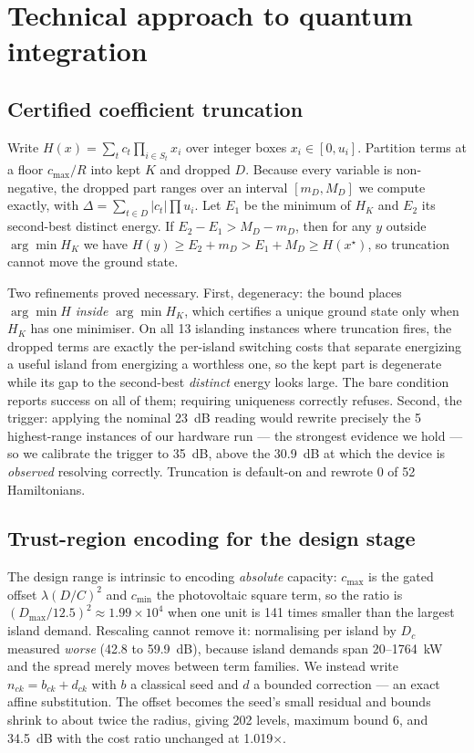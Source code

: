 \documentclass[11pt,twocolumn]{article}
\begin{document}
\section{Technical approach to quantum integration}
\subsection{Certified coefficient truncation}
Write $H(x)=\sum_t c_t \prod_{i \in S_t} x_i$ over integer boxes $x_i \in [0,u_i]$. Partition terms at a floor $c_{\max}/R$ into kept $K$ and dropped $D$. Because every variable is non-negative, the dropped part ranges over an interval $[m_D, M_D]$ we compute exactly, with $\Delta=\sum_{t \in D}|c_t|\prod u_i$. Let $E_1$ be the minimum of $H_K$ and $E_2$ its second-best distinct energy. If $E_2-E_1 > M_D-m_D$, then for any $y$ outside $\arg\min H_K$ we have $H(y) \ge E_2+m_D > E_1+M_D \ge H(x^\star)$, so truncation cannot move the ground state.

Two refinements proved necessary. First, degeneracy: the bound places $\arg\min H$ {\em inside} $\arg\min H_K$, which certifies a unique ground state only when $H_K$ has one minimiser. On all 13 islanding instances where truncation fires, the dropped terms are exactly the per-island switching costs that separate energizing a useful island from energizing a worthless one, so the kept part is degenerate while its gap to the second-best {\em distinct} energy looks large. The bare condition reports success on all of them; requiring uniqueness correctly refuses. Second, the trigger: applying the nominal 23~dB reading would rewrite precisely the 5 highest-range instances of our hardware run --- the strongest evidence we hold --- so we calibrate the trigger to 35~dB, above the 30.9~dB at which the device is {\em observed} resolving correctly. Truncation is default-on and rewrote 0 of 52 Hamiltonians.

\subsection{Trust-region encoding for the design stage}
The design range is intrinsic to encoding {\em absolute} capacity: $c_{\max}$ is the gated offset $\lambda(D/C)^2$ and $c_{\min}$ the photovoltaic square term, so the ratio is $(D_{\max}/12.5)^2 \approx 1.99\times 10^4$ when one unit is 141 times smaller than the largest island demand. Rescaling cannot remove it: normalising per island by $D_c$ measured {\em worse} (42.8 to 59.9~dB), because island demands span 20--1764~kW and the spread merely moves between term families. We instead write $n_{ck} = b_{ck} + d_{ck}$ with $b$ a classical seed and $d$ a bounded correction --- an exact affine substitution. The offset becomes the seed's small residual and bounds shrink to about twice the radius, giving 202 levels, maximum bound 6, and 34.5~dB with the cost ratio unchanged at 1.019$\times$.
\end{document}
